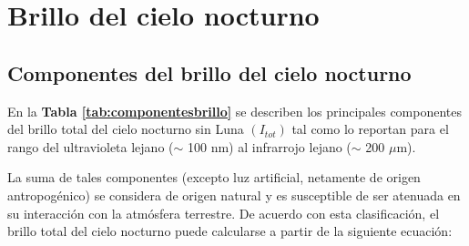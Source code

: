 \newpage

\section{Brillo del cielo nocturno}
\label{sec:brillocielonocturno}

\subsection{Componentes del brillo del cielo nocturno}
\label{subsec:componentesbrillocielo}

En la \textbf{Tabla \ref{tab:componentesbrillo}} se describen los principales componentes del brillo total del cielo nocturno sin Luna $(I_{tot})$ tal como \cite{Leinert1998} lo reportan para el rango del ultravioleta lejano ($\sim$ 100 nm) al infrarrojo lejano ($\sim$ 200 $\mu$m).


\begin{table}[htb]
\centering
\caption{Componentes del brillo del cielo nocturno \citep{Leinert1998}}
\label{tab:componentesbrillo}
\end{table}

La suma de tales componentes (excepto luz artificial, netamente de origen antropogénico) se considera de origen natural y es susceptible de ser atenuada en su interacción con la atmósfera terrestre. De acuerdo con esta clasificación, el brillo total del cielo nocturno puede calcularse a partir de la siguiente ecuación:

